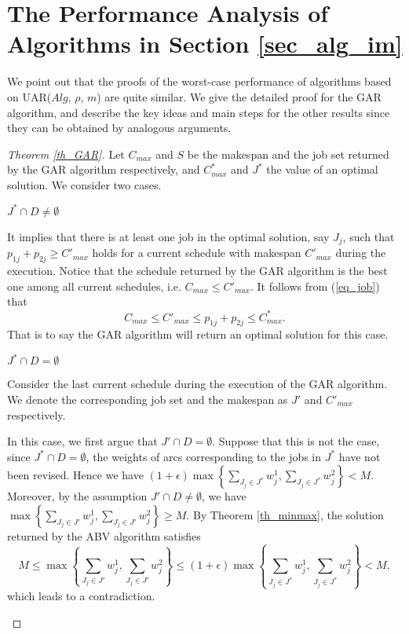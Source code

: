 \documentclass{llncs}
\newcommand{\be}{\begin{equation}}
\newcommand{\ee}{\end{equation}}
\numberwithin{subcase}{case}
\begin{document}
\section{The Performance Analysis of Algorithms in Section \ref{sec_alg_im}}\label{app_proof}
We point out that the proofs of the worst-case performance of algorithms based on UAR($Alg$, $\rho$, $m$) are quite similar. We give the detailed proof for the GAR algorithm, and describe the key ideas and main steps for the other results since they can be obtained by analogous arguments.

\begin{proof}[Theorem \ref{th_GAR}]
Let $C_{max}$ and $S$ be the makespan and the job set returned by the GAR algorithm respectively, and $C^*_{max}$ and $J^*$ the value of an optimal solution. We consider two cases.
\setcounter{case}{0}
\begin{case} $J^*\cap D \neq \emptyset$

It implies that there is at least one job in the optimal solution, say $J_j$, such that $p_{1j} + p_{2j} \geq C'_{max}$ holds for a current schedule with makespan $C'_{max}$ during the execution. Notice that the schedule returned by the GAR algorithm is the best one among all current schedules, i.e. $C_{max} \leq C'_{max}$. It follows from (\ref{eq_job}) that
\be
C_{max}  \leq C'_{max} \leq p_{1j} + p_{2j} \leq C^*_{max}.
\ee
That is to say the GAR algorithm will return an optimal solution for this case.
\end{case}
\begin{case}
$J^*\cap D = \emptyset$

Consider the last current schedule during the execution of the GAR algorithm. We denote the corresponding job set and the makespan as $J'$ and $C'_{max}$ respectively.

In this case, we first argue that $J' \cap D = \emptyset$. Suppose that this is not the case, since $J^*\cap D = \emptyset$, the weights of arcs corresponding to the jobs in $J^*$ have not been revised. Hence we have $ (1+\epsilon)\max \left\{\sum_{J_j\in J^*}w^1_j, \sum_{J_j\in J^*}w^2_j\right\}< M$. Moreover, by the assumption $J' \cap D \neq \emptyset$, we have $\max \left\{\sum_{J_j\in J'}w^1_j, \sum_{J_j\in J'}w^2_j\right\} \geq M$. By Theorem \ref{th_minmax}, the solution returned by the ABV algorithm satisfies
\begin{equation*}
M \leq \max \left\{\sum_{J_j\in J'}w^1_j, \sum_{J_j\in J'}w^2_j\right\} \leq (1+\epsilon)\max \left\{\sum_{J_j\in J^*}w^1_j, \sum_{J_j\in J^*}w^2_j\right\} < M,
\end{equation*} which leads to a contradiction.


\end{case}
\end{proof}
\end{document}
